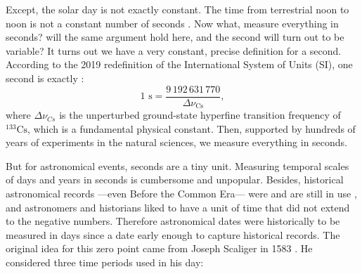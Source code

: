 	Except, the solar day is not exactly constant. The time from terrestrial noon to noon is not a constant number of seconds \citep{McCarthy1986}.
	Now what, measure everything in seconds? will the same argument hold here, and the second will turn out to be variable? 
	It turns out we have a very constant, precise definition for a second. 
	According to the 2019 redefinition of the International System of Units (SI),
	one second is exactly \citep{si-brochure}:
	\begin{equation}
		1\text{ s} = \frac{9\,192\,631\,770}{\Delta\nu_{\text{Cs}}}, \label{eq:SI-second}
	\end{equation}
	where $\Delta\nu_{Cs}$ is the unperturbed ground-state hyperfine transition frequency of ${}^{133}\text{Cs}$, which is a fundamental physical constant.
	Then, supported by hundreds of years of experiments in the natural sciences, we measure everything in seconds. 
	
	
	But for astronomical events, seconds are a tiny unit. Measuring temporal scales of days and years in seconds is cumbersome and unpopular.
	Besides, historical astronomical records ---even Before the Common Era--- were and are still in use \citep{Morrison2004},
	and astronomers and historians liked to have a unit of time that did not extend to the negative numbers.
	Therefore astronomical dates were historically to be measured in days since a date early enough to capture historical records.
	The original idea for this zero point came from Joseph Scaliger in 1583 \citep{Carroll2017}. 
	He considered three time periods used in his day:
	
